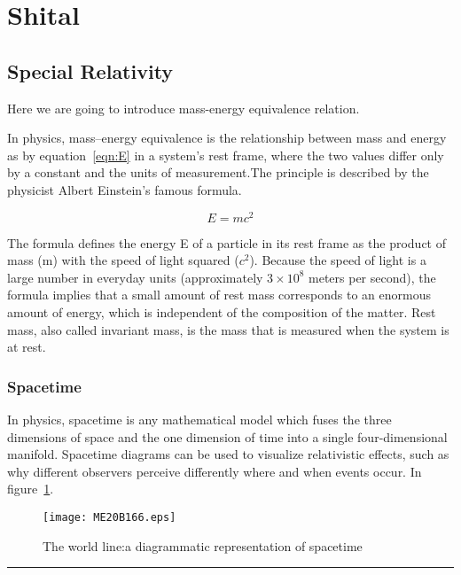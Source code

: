 \section{Shital}


\subsection{Special Relativity}

Here we are going to introduce mass-energy equivalence relation.

In physics, mass–energy equivalence is the relationship between mass and energy as by equation~\ref{eqn:E} in a system's rest frame, where the two values differ only by a constant and the units of measurement.The principle is described by the physicist Albert Einstein's famous formula.~\cite{Einstie}

\begin{equation}
	E=mc^2
	\label{eqn:E}
\end{equation}

The formula defines the energy E of a particle in its rest frame as the product of mass (m) with the speed of light squared ($c^2$). Because the speed of light is a large number in everyday units (approximately $3 \times 10 ^8$ meters per second), the formula implies that a small amount of rest mass corresponds to an enormous amount of energy, which is independent of the composition of the matter. Rest mass, also called invariant mass, is the mass that is measured when the system is at rest.


\subsubsection{Spacetime}

In physics, spacetime is any mathematical model which fuses the three dimensions of space and the one dimension of time into a single four-dimensional manifold. Spacetime diagrams can be used to visualize relativistic effects, such as why different observers perceive differently where and when events occur. In figure~\ref{f1:spacetime}.~\cite{Einstie}

\begin{figure}[h]
	\begin{center}
		\texttt{[image: ME20B166.eps]}
	\end{center}
	\caption{The world line:a diagrammatic representation of spacetime}
	\label{f1:spacetime}
\end{figure}

\hrule
